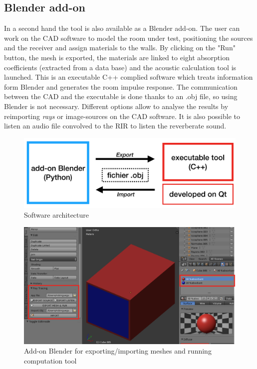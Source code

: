 \documentclass[AMA,STIX1COL]{WileyNJD-v2}
\begin{document}
\subsection{Blender add-on}
In a second hand the tool is also available as a Blender add-on. The user can work on the CAD software to model the room under test, positioning the sources and the receiver and assign materials to the walls. By clicking on the "Run" button, the mesh is exported, the materials are linked to eight absorption coefficients (extracted from a data base) and the acoustic calculation tool is launched. This is an executable C++ complied software which treats information form Blender and generates the room impulse response. The communication between the CAD and the executable is done thanks to an .obj file, so using Blender is not necessary. Different options allow to analyse the results by reimporting \textit{rays} or image-sources on the CAD software. It is also possible to listen an audio file convolved to the RIR to listen the reverberate sound.



\begin{figure}[h]
\centering
	\includegraphics[width=0.5\linewidth]{software}
	\caption{Software architecture}
\end{figure}

\begin{figure}[h]
\centering
	\includegraphics[width=0.8\linewidth]{add-on}
	\caption{Add-on Blender for exporting/importing meshes and running computation tool}
	\label{add-on}
\end{figure}
\end{document}
